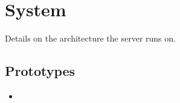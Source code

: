
\section{System}
Details on the architecture the \urbi server runs on.

\subsection{Prototypes}
\begin{itemize}
\item {}
\end{itemize}


